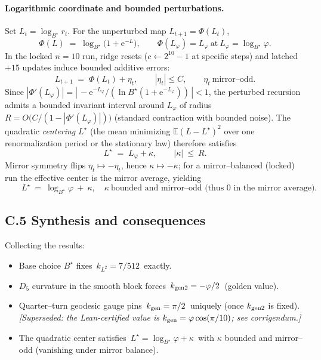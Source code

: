 \documentclass[12pt]{article}
\numberwithin{equation}{section}
\begin{document}
\paragraph{Logarithmic coordinate and bounded perturbations.}
Set $L_t=\log_{B^\star} r_t$.  For the unperturbed map $L_{t+1}=\Phi(L_t)$,
\[
\Phi(L)\;=\;\log_{B^\star}\!\Big(1+\mathrm{e}^{-L}\Big),\qquad \Phi(L_\varphi)=L_\varphi\ \text{at}\ L_\varphi=\log_{B^\star}\varphi.
\]
In the locked $n=10$ run, ridge resets ($c\leftarrow 2^{10}-1$ at specific steps) and latched $+15$ updates induce bounded additive errors:
\[
L_{t+1}\;=\;\Phi(L_t)+\eta_t,\qquad |\eta_t|\le C,\qquad \eta_t\ \text{mirror–odd}.
\]
Since $|\Phi'(L_\varphi)|=|\,-\mathrm{e}^{-L_\varphi}/(\ln B^\star (1+\mathrm{e}^{-L_\varphi}))\,|<1$, the perturbed recursion admits a bounded invariant interval around $L_\varphi$ of radius $R=O\!\big(C/(1-|\Phi'(L_\varphi)|)\big)$ (standard contraction with bounded noise).  The quadratic \emph{centering} $L^\star$ (the mean minimizing $\mathbb{E}(L-L^\star)^2$ over one renormalization period or the stationary law) therefore satisfies
\[
L^\star\;=\;L_\varphi+\kappa,\qquad |\kappa|\ \le\ R.
\]
Mirror symmetry flips $\eta_t\mapsto -\eta_t$, hence $\kappa\mapsto -\kappa$; for a mirror–balanced (locked) run the effective center is the mirror average, yielding
\[
\boxed{\qquad L^\star\ =\ \log_{B^\star}\varphi\ +\ \kappa,\quad \kappa\ \text{bounded and mirror–odd (thus $0$ in the mirror average).}\qquad}
\]

\bigskip
\subsection*{C.5 \; Synthesis and consequences}

Collecting the results:

\begin{itemize}
\item Base choice $B^\star$ fixes \,$k_{L^2}=7/512$\, exactly.
\item $D_5$ curvature in the smooth block forces \,$k_{\rm gen2}=-\varphi/2$\, (golden value).
\item Quarter–turn geodesic gauge pins \,$k_{\rm gen}=\pi/2$\, uniquely (once $k_{\rm gen2}$ is fixed). \textit{[Superseded: the Lean-certified value is $k_{\rm gen}=\varphi\cos(\pi/10)$; see corrigendum.]}
\item The quadratic center satisfies \,$L^\star=\log_{B^\star}\varphi+\kappa$\, with $\kappa$ bounded and mirror–odd (vanishing under mirror balance).
\end{itemize}
\end{document}
